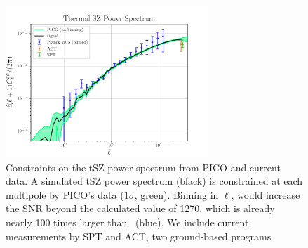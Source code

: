 \documentclass[PICOReport.tex]{subfiles}
\begin{document}
\begin{figure}
\hspace{-0.1in}
\parbox{3.1in}{\centerline{
\includegraphics[width=3.0in]{images/PICO_tSZ_PS_plot.pdf} } }
\hspace{0.in}
\parbox{3.4in}{
\caption{\label{fig:PICO_tSZ_PS} Constraints on the tSZ power spectrum from PICO and current data.  A simulated tSZ power spectrum (black) is constrained at each multipole by PICO's data ($1\sigma$, green). Binning in $\ell$, would increase the \ac{SNR} beyond the calculated value of 1270, which is already nearly 100 times larger than \planck\ (blue). We include current measurements by SPT and ACT, two ground-based programs~\citep{Sievers2013,George2015}
} }
\vspace{-0.1in}
\end{figure}
\end{document}
